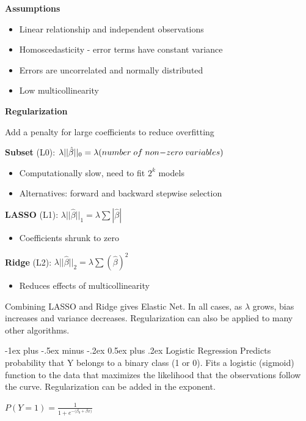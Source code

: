 \documentclass[10pt,landscape]{article}
\makeatletter
\renewcommand{\section}{\@startsection{section}{1}{0mm}%
                                {-1ex plus -.5ex minus -.2ex}%
                                {0.5ex plus .2ex}%
                                {\normalfont\large\bfseries}}
\makeatother
\begin{document}
\begin{multicols}{3}
\textbf{Assumptions}
\begin{itemize}[label={--},leftmargin=4mm]
\vspace{-1mm}
\itemsep -.4mm 
\item Linear relationship and independent observations
\item Homoscedasticity - error terms have constant variance
\item Errors are uncorrelated and normally distributed
\item Low multicollinearity
\end{itemize}
\textbf{Regularization} 

Add a penalty for large coefficients to reduce overfitting 

\textbf{Subset}  (L0): $\lambda ||\hat{\beta}||_0 = \lambda (number \;of\;non\hspace{-.7mm}-\hspace{-.7mm}zero\; variables)$ 
\begin{itemize}[label={--},leftmargin=4mm]
\vspace{-1mm}
\itemsep -.4mm 
\item Computationally slow, need to fit $2^k$ models
\item Alternatives: forward and backward stepwise selection
\end{itemize}
\textbf{LASSO}  (L1): $\lambda ||\hat{\beta}||_1 = \lambda\sum | \hat{\beta} |$
\begin{itemize}[label={--},leftmargin=4mm]
\vspace{-1mm}
\itemsep -.4mm 
\item Coefficients shrunk to zero
\end{itemize}
\textbf{Ridge}  (L2): $\lambda ||\hat{\beta}||_2 = \lambda\sum( \hat{\beta})^2$ 
\begin{itemize}[label={--},leftmargin=4mm]
\vspace{-1mm}
\itemsep -.4mm 
\item Reduces effects of multicollinearity
\end{itemize}
Combining LASSO and Ridge gives Elastic Net. In all cases, as $\lambda$ grows, bias increases and variance decreases. Regularization can also be applied to many other algorithms.

\columnbreak
\section{Logistic Regression}
Predicts probability that Y belongs to a binary class (1 or 0). Fits a logistic (sigmoid) function to the data that maximizes the likelihood that the observations follow the curve. Regularization can be added in the exponent.
\vspace{-2mm}
\begin{center}
$\displaystyle P(Y=1) = \frac{1}{1 + e^{-({\beta_0} + {\beta x)}}}$


\end{center}
\end{multicols}
\end{document}
